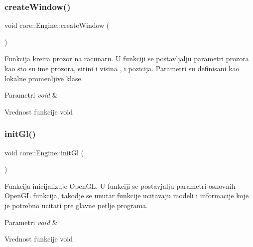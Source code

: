 \subsubsection{\texorpdfstring{create\+Window()}{createWindow()}}
{\footnotesize\ttfamily void core\+::\+Engine\+::create\+Window (\begin{DoxyParamCaption}\item[{void}]{ }\end{DoxyParamCaption})\hspace{0.3cm}{\ttfamily [private]}}



Funkcija kreira prozor na racunaru. U funkciji se postavljalju parametri prozora kao sto su ime prozora, sirini i visina , i pozicija. Parametri su definisani kao lokalne promenljive klase. 


\begin{DoxyParams}{Parametri}
{\em void} & \\
\hline
\end{DoxyParams}
\begin{DoxyReturn}{Vrednost funkcije}
void 
\end{DoxyReturn}
\mbox{\label{classcore_1_1Engine_a6cfe680acf87f9882f92b1ffc134021f}} 
\subsubsection{\texorpdfstring{init\+Gl()}{initGl()}}
{\footnotesize\ttfamily void core\+::\+Engine\+::init\+Gl (\begin{DoxyParamCaption}\item[{void}]{ }\end{DoxyParamCaption})\hspace{0.3cm}{\ttfamily [private]}}



Funkcija inicijalizuje Open\+GL. U funkciji se postavjalju parametri osnovnih Open\+GL funkcija, takodje se unutar funkcije ucitavaju modeli i informacije koje je potrebno ucitati pre glavne petlje programa. 


\begin{DoxyParams}{Parametri}
{\em void} & \\
\hline
\end{DoxyParams}
\begin{DoxyReturn}{Vrednost funkcije}
void 
\end{DoxyReturn}
\mbox{\label{classcore_1_1Engine_a737de95b00aa5b62c466f2e3dc4edcdb}} 
